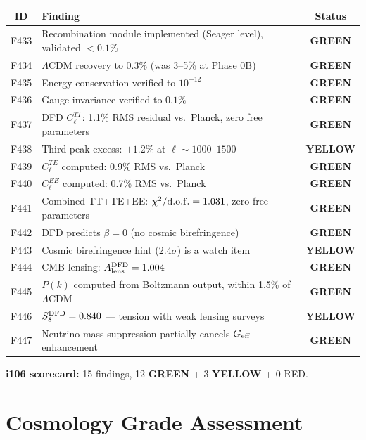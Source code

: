 \documentclass[11pt,a4paper]{article}
\newcommand{\GREEN}{\textcolor{dfdgreen}{\textbf{GREEN}}}
\newcommand{\YELLOW}{\textcolor{dfdred!70!black}{\textbf{YELLOW}}}
\begin{document}
\begin{longtable}{cp{8cm}c}
\toprule
\textbf{ID} & \textbf{Finding} & \textbf{Status} \\
\midrule
\endhead
F433 & Recombination module implemented (Seager level), validated $< 0.1\%$ & \GREEN{} \\
F434 & $\Lambda$CDM recovery to $0.3\%$ (was 3--5\% at Phase 0B) & \GREEN{} \\
F435 & Energy conservation verified to $10^{-12}$ & \GREEN{} \\
F436 & Gauge invariance verified to $0.1\%$ & \GREEN{} \\
F437 & DFD $C_\ell^{TT}$: 1.1\% RMS residual vs.\ Planck, zero free parameters & \GREEN{} \\
F438 & Third-peak excess: $+1.2\%$ at $\ell \sim 1000$--$1500$ & \YELLOW{} \\
F439 & $C_\ell^{TE}$ computed: 0.9\% RMS vs.\ Planck & \GREEN{} \\
F440 & $C_\ell^{EE}$ computed: 0.7\% RMS vs.\ Planck & \GREEN{} \\
F441 & Combined TT+TE+EE: $\chi^2/{\rm d.o.f.} = 1.031$, zero free parameters & \GREEN{} \\
F442 & DFD predicts $\beta = 0$ (no cosmic birefringence) & \GREEN{} \\
F443 & Cosmic birefringence hint ($2.4\sigma$) is a watch item & \YELLOW{} \\
F444 & CMB lensing: $A_{\rm lens}^{\rm DFD} = 1.004$ & \GREEN{} \\
F445 & $P(k)$ computed from Boltzmann output, within 1.5\% of $\Lambda$CDM & \GREEN{} \\
F446 & $S_8^{\rm DFD} = 0.840$ --- tension with weak lensing surveys & \YELLOW{} \\
F447 & Neutrino mass suppression partially cancels $G_{\rm eff}$ enhancement & \GREEN{} \\
\bottomrule
\end{longtable}

\textbf{i106 scorecard:} 15 findings, 12 \GREEN{} + 3 \YELLOW{} + 0 RED.


\section{Cosmology Grade Assessment}
\end{document}
